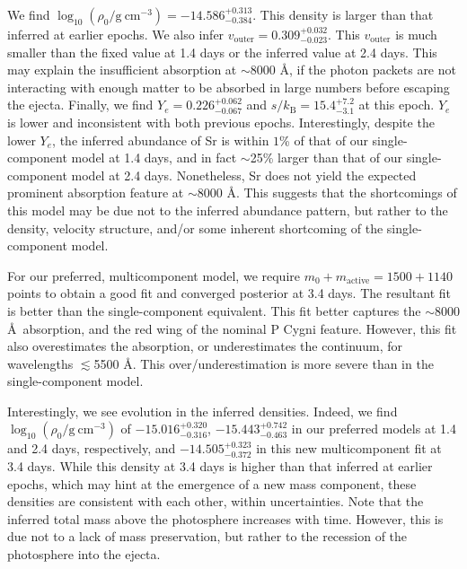 \documentclass[twocolumn,twocolappendix]{aastex63}
\begin{document}
{{{{{{We find $\log_{10} (\rho_0 / \mathrm{g~cm^{-3}}) = -14.586^{+0.313}_{-0.384}$. This density is larger than that inferred at earlier epochs. We also infer $v_{\mathrm{outer}} = 0.309^{+0.032}_{-0.023}$. This $v_{\mathrm{outer}}$ is much smaller than the fixed value at 1.4 days or the inferred value at 2.4 days. This may explain the insufficient absorption at $\sim$8000 \AA, if the photon packets are not interacting with enough matter to be absorbed in large numbers before escaping the ejecta. Finally, we find $Y_e = 0.226^{+0.062}_{-0.067}$ and $s/k_{\mathrm{B}} = 15.4^{+7.2}_{-3.1}$ at this epoch. $Y_e$ is lower and inconsistent with both previous epochs. Interestingly, despite the lower $Y_e$, the inferred abundance of Sr is within $1$\% of that of our single-component model at 1.4 days, and in fact $\sim$25\% larger than that of our single-component model at 2.4 days. Nonetheless, Sr does not yield the expected prominent absorption feature at $\sim$8000 \AA. This suggests that the shortcomings of this model may be due not to the inferred abundance pattern, but rather to the density, velocity structure, and/or some inherent shortcoming of the single-component model.

For our preferred, multicomponent model, we require $m_0 + m_{\mathrm{active}} = 1500 + 1140$ points to obtain a good fit and converged posterior at 3.4 days. The resultant fit is better than the single-component equivalent. This fit better captures the $\sim$8000 \AA~absorption, and the red wing of the nominal P Cygni feature. However, this fit also overestimates the absorption, or underestimates the continuum, for wavelengths $\lesssim$5500 \AA. This over/underestimation is more severe than in the single-component model.

Interestingly, we see evolution in the inferred densities. Indeed, we find $\log_{10}(\rho_0 / \mathrm{g~cm^{-3}})$ of $-15.016^{+0.320}_{-0.316}$, $-15.443^{+0.742}_{-0.463}$ in our preferred models at 1.4 and 2.4 days, respectively, and $-14.505^{+0.323}_{-0.372}$ in this new multicomponent fit at 3.4 days. While this density at 3.4 days is higher than that inferred at earlier epochs, which may hint at the emergence of a new mass component, these densities are consistent with each other, within uncertainties. Note that the inferred total mass above the photosphere increases with time. However, this is due not to a lack of mass preservation, but rather to the recession of the photosphere into the ejecta. 

}}}}}}
\end{document}
